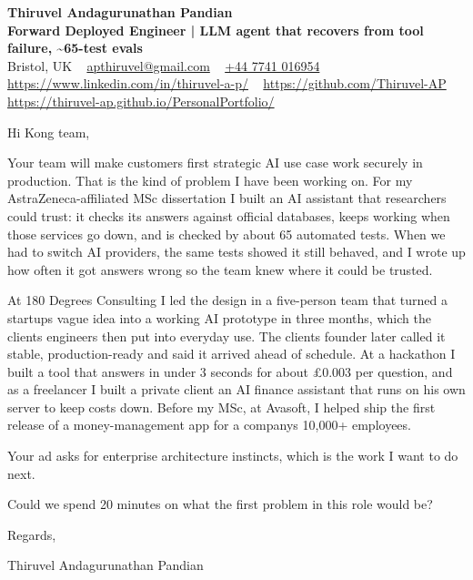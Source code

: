 \documentclass[11pt,a4paper]{article}
\begin{document}
\raggedright
\pagestyle{empty}

\begin{center}
    {\LARGE \color{linkblue} \textbf{Thiruvel Andagurunathan Pandian}}\\[0.2cm]
    {\color{headernavy}\small\textbf{Forward Deployed Engineer | LLM agent that recovers from tool failure, \textasciitilde{}65-test evals}}\\[0.2cm]
    {\small Bristol, UK\nobreak\ \,\textbar\, \href{mailto:apthiruvel@gmail.com}{apthiruvel@gmail.com}\nobreak\ \,\textbar\, \href{tel:+447741016954}{+44 7741 016954}\nobreak\ \,\textbar\, \href{https://www.linkedin.com/in/thiruvel-a-p/}{https://www.linkedin.com/in/thiruvel-a-p/}\nobreak\ \,\textbar\, \href{https://github.com/Thiruvel-AP}{https://github.com/Thiruvel-AP}\nobreak\ \,\textbar\, \href{https://thiruvel-ap.github.io/PersonalPortfolio/}{https://thiruvel-ap.github.io/PersonalPortfolio/}}

\end{center}

\vspace{0.4cm}

\noindent
Hi Kong team,

Your team will make customers\textquotesingle{} first strategic AI use case work securely in production. That is the kind of problem I have been working on. For my AstraZeneca-affiliated MSc dissertation I built an AI assistant that researchers could trust: it checks its answers against official databases, keeps working when those services go down, and is checked by about 65 automated tests. When we had to switch AI providers, the same tests showed it still behaved, and I wrote up how often it got answers wrong so the team knew where it could be trusted.

At 180 Degrees Consulting I led the design in a five-person team that turned a startup\textquotesingle{}s vague idea into a working AI prototype in three months, which the client\textquotesingle{}s engineers then put into everyday use. The client\textquotesingle{}s founder later called it \textquotedbl{}stable, production-ready\textquotedbl{} and said it arrived \textquotedbl{}ahead of schedule\textquotedbl{}. At a hackathon I built a tool that answers in under 3 seconds for about £0.003 per question, and as a freelancer I built a private client an AI finance assistant that runs on his own server to keep costs down. Before my MSc, at Avasoft, I helped ship the first release of a money-management app for a company\textquotesingle{}s 10,000+ employees.

Your ad asks for enterprise architecture instincts, which is the work I want to do next.

Could we spend 20 minutes on what the first problem in this role would be?

\vspace{0.5cm}

Regards,

Thiruvel Andagurunathan Pandian
\end{document}
